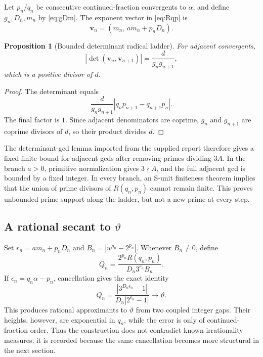\documentclass[11pt]{article}
\newtheorem{proposition}[theorem]{Proposition}
\theoremstyle{definition}
\begin{document}
Let \(p_n/q_n\) be consecutive continued-fraction convergents to \(\alpha\),
and define \(g_n,D_n,m_n\) by \cref{eq:gDm}.  The exponent vector in
\cref{eq:Rqp} is
\begin{equation}\label{eq:radical-vector}
 \mathbf v_n=
 \left(m_n,\,am_n+p_nD_n\right).
\end{equation}

\begin{proposition}[Bounded determinant radical ladder]\label{prop:radical-det}
For adjacent convergents,
\begin{equation}\label{eq:radical-det}
 \left|\det(\mathbf v_n,\mathbf v_{n+1})\right|
 =\frac{d}{g_ng_{n+1}},
\end{equation}
which is a positive divisor of \(d\).
\end{proposition}

\begin{proof}
The determinant equals
\[
 \frac{d}{g_ng_{n+1}}
 |q_np_{n+1}-q_{n+1}p_n|.
\]
The final factor is \(1\).  Since adjacent denominators are coprime,
\(g_n\) and \(g_{n+1}\) are coprime divisors of \(d\), so their product
divides \(d\).
\end{proof}

The determinant-gcd lemma imported from the supplied report therefore gives
a fixed finite bound for adjacent gcds after removing primes dividing
\(3A\).  In the branch \(a>0\), primitive normalization gives \(3\nmid A\),
and the full adjacent gcd is bounded by a fixed integer.  In every branch,
an S-unit finiteness theorem implies that the union of prime divisors of
\(R(q_n,p_n)\) cannot remain finite.  This proves unbounded prime support
along the ladder, but not a new prime at every step.

\subsection{A rational secant to \(\vartheta\)}

Set \(r_n=am_n+p_nD_n\) and
\(B_n=|w^{q_n}-2^{p_n}|\).  Whenever \(B_n\ne0\), define
\begin{equation}\label{eq:Qn-secant}
 Q_n=\frac{2^{p_n}R(q_n,p_n)}{D_n3^{r_n}B_n}.
\end{equation}
If \(\epsilon_n=q_n\alpha-p_n\), cancellation gives the exact identity
\begin{equation}\label{eq:Qn-cancel}
 Q_n=\frac{|3^{D_n\epsilon_n}-1|}
           {D_n|2^{\epsilon_n}-1|}
 \longrightarrow\vartheta.
\end{equation}
This produces rational approximants to \(\vartheta\) from two coupled
integer gaps.  Their heights, however, are exponential in \(q_n\), while
the error is only of continued-fraction order.  Thus the construction does
not contradict known irrationality measures; it is recorded because the
same cancellation becomes more structural in the next section.
\end{document}
